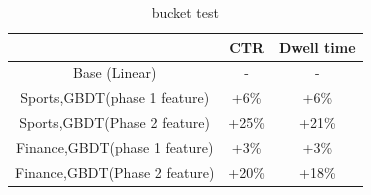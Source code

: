 \begin{table}
\caption{bucket test}
\begin{tabular}{|c|c|c|}\hline
             & CTR & Dwell time  \\ \hline
Base (Linear) &  - & -   \\ \hline 
Sports,GBDT(phase 1 feature)    & +6\% & +6\% \\ \hline
Sports,GBDT(Phase 2 feature) & +25\% & +21\% \\ \hline
Finance,GBDT(phase 1 feature)  & +3\% & +3\% \\  \hline
Finance,GBDT(Phase 2 feature) & +20\% & +18\%  \\  \hline
\end{tabular}

\label{bucket test}
\end{table}







